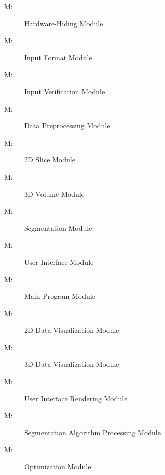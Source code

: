 \documentclass[12pt, titlepage]{article}
\newcounter{mnum}
\newcommand{\mthemnum}{M\themnum}
\begin{document}
\begin{description}
  \item [ \mthemnum \label{mHH}:] Hardware-Hiding Module
  \item [ \mthemnum \label{mIF}:] Input Format Module
  \item [ \mthemnum \label{mIV}:] Input Verification Module
  \item [ \mthemnum \label{mDP}:] Data Preprocessing Module

  \item [ \mthemnum \label{m2DS}:] 2D Slice Module

  \item [ \mthemnum \label{m3DV}:] 3D Volume Module

  \item [ \mthemnum \label{mSeg}:] Segmentation Module

  \item [ \mthemnum \label{mUI}:] User Interface Module

  \item [ \mthemnum \label{mMP}:] Main Program Module

  \item [ \mthemnum \label{m2DDV}:] 2D Data Visualization Module
  \item [ \mthemnum \label{m3DDV}:] 3D Data Visualization Module

  \item [ \mthemnum \label{mUIR}:] User Interface Rendering Module
  \item [ \mthemnum \label{mSegP}:] Segmentation Algorithm Processing Module
  \item [ \mthemnum \label{mOp}:] Optimization Module

\end{description}
\end{document}
